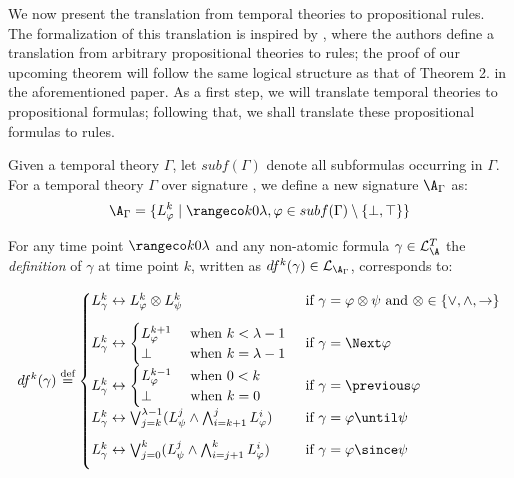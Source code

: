We now present the translation from temporal theories to propositional
rules. The formalization of this translation is inspired by
\cite[p. 9]{capeva05a}, where the authors define a translation from
arbitrary propositional theories to rules; the proof of our upcoming
theorem will follow the same logical structure as that of Theorem
2. in the aforementioned paper. As a first step, we will translate
temporal theories to propositional formulas; following that, we shall
translate these propositional formulas to rules.

Given a temporal theory $\Gamma$, let $subf(\Gamma)$ denote all
subformulas occurring in $\Gamma$. For a temporal theory $\Gamma$ over
signature \A, we define a new signature $\A_{\Gamma}$ as:
$$
\A_{\Gamma} = \{ L_{\varphi}^k \mid \kinlambda, \varphi \in subf(\Gamma)
\setminus \{ \bot, \top \} \}
$$

For any time point $\kinlambda$ and any non-atomic formula $\gamma \in \mathcal{L}_\A^T$ the \emph{definition} of $\gamma$ at time point $k$, written as $df^k(\gamma) \in \mathcal{L}_{\A_{\Gamma}}$, corresponds to:

\begin{align*}
df^k(\gamma) \defeq \begin{cases}
  L^k_{\gamma} \leftrightarrow L_{\varphi}^k \otimes L_{\psi}^k 
  &\text{ if } \gamma = \varphi \otimes \psi \text{ and } \otimes \in \{ \vee, \wedge, \rightarrow \}\\[2ex]
  L^k_\gamma \leftrightarrow \begin{cases} 
    L^{k+1}_{\varphi} &\text{ when } k < \lambda - 1\\
    \bot &\text{ when } k = \lambda - 1
    \end{cases}
  &\text{ if } \gamma = \Next \varphi \\[2ex]
  L^k_{\gamma} \leftrightarrow \begin{cases} 
    L^{k-1}_{\varphi} &\text{ when } 0 < k\\
    \bot &\text{ when } k = 0
    \end{cases}
  &\text{ if } \gamma = \previous \varphi \\[2ex]
  L^k_{\gamma} \leftrightarrow \bigvee_{j=k}^{\lambda-1}(L_\psi^j \wedge \bigwedge_{i=k+1}^{j}L_{\varphi}^i)
  &\text{ if } \gamma = \varphi \until \psi \\[2ex]
  L^k_{\gamma} \leftrightarrow \bigvee_{j=0}^{k}(L_\psi^j \wedge \bigwedge_{i=j+1}^{k}L_{\varphi}^i)
  &\text{ if } \gamma = \varphi \since \psi \\[2ex]
\end{cases}
\end{align*}

